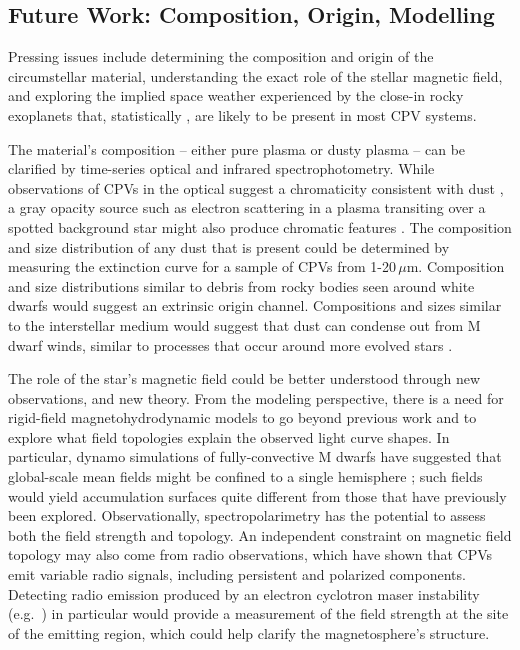 \documentclass[11pt,twocolumn,tighten,linenumbers]{aastex7}
\begin{document}
\subsection{Future Work: Composition, Origin, Modelling}

Pressing issues include determining the composition and origin of the
circumstellar material, understanding the exact role of the stellar
magnetic field, and exploring the implied space weather experienced by
the close-in rocky exoplanets that, statistically \citep{Dressing2015},
are likely to be present in most CPV systems.

The material's composition -- either pure plasma or dusty plasma -- can
be clarified by time-series optical and infrared spectrophotometry.
While observations of CPVs in the optical suggest a chromaticity
consistent with dust \citep{Tanimoto2020,Gunther2022,Koen2023}, a gray
opacity source such as electron scattering in a plasma transiting over a
spotted background star might also produce chromatic features
\citep{Rackham2018}.  The composition and size distribution of any dust
that is present could be determined by measuring the extinction curve
for a sample of CPVs from 1-20\,$\mu$m.  Composition and size
distributions similar to debris from rocky bodies seen around white
dwarfs \citep{Reach2009} would suggest an extrinsic origin channel.
Compositions and sizes similar to the interstellar medium would suggest
that dust can condense out from M dwarf winds, similar to processes that
occur around more evolved stars \citep{Marigo2008}.

The role of the star's magnetic field could be better understood through
new observations, and new theory.  From the modeling perspective,
there is a need for rigid-field magnetohydrodynamic models to
go beyond previous work \citep{Townsend2005,Townsend2008,Krticka2022}
and to explore what field topologies explain the observed light
curve shapes.  In particular, dynamo simulations of
fully-convective M dwarfs have suggested that global-scale mean fields
might be confined to a single hemisphere \citep{Brown2020}; such fields
would yield accumulation surfaces quite different from those that have
previously been explored.  Observationally, spectropolarimetry has the
potential to assess both the field strength and topology.  An
independent constraint on magnetic field topology may also come from
radio observations, which have shown \citep{Kaur2024} that CPVs emit
variable radio signals, including persistent and polarized components.
Detecting radio emission produced by an electron cyclotron maser
instability (e.g.~\citealt{Callingham2021}) in particular would provide
a measurement of the field strength at the site of the emitting region,
which could help clarify the magnetosphere's structure.
\end{document}
